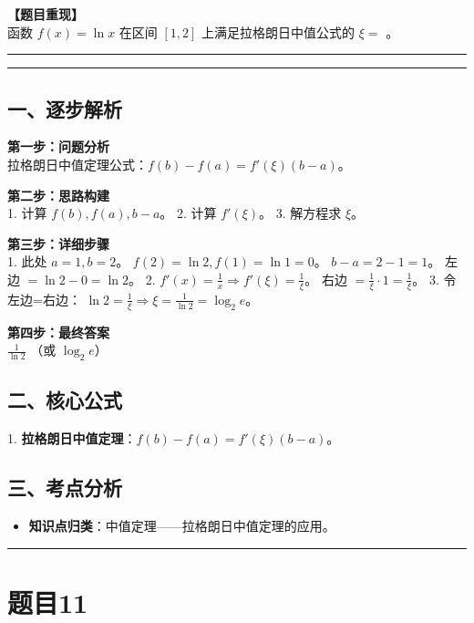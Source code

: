 \documentclass[12pt, a4paper]{ctexart}
\newcommand{\TopSeparator}{
    \par\noindent\rule{\textwidth}{1.5pt}\vspace{0.5em} %
}
\newcommand{\AnalysisSeparator}{
    \par\noindent\rule{\textwidth}{0.5pt}\vspace{0.2em}\hrule\vspace{0.5em} %
}
\newenvironment{RedAnalysis}{
    \par
    \color{red} %
}{
    \par
    \color{black} %
}
\begin{document}
\textbf{【题目重现】} \\
函数 $ f(x)=\ln x $ 在区间 $[1,2]$ 上满足拉格朗日中值公式的 $ \xi= $ \underline{\hspace{2cm}}。

\AnalysisSeparator

\begin{RedAnalysis}

\subsection*{一、逐步解析}

\textbf{第一步：问题分析} \\
拉格朗日中值定理公式：$f(b) - f(a) = f'(\xi)(b-a)$。

\textbf{第二步：思路构建} \\
1. 计算 $f(b), f(a), b-a$。
2. 计算 $f'(\xi)$。
3. 解方程求 $\xi$。

\textbf{第三步：详细步骤} \\
1. 此处 $a=1, b=2$。
   $f(2) = \ln 2, f(1) = \ln 1 = 0$。
   $b-a = 2-1 = 1$。
   左边 $= \ln 2 - 0 = \ln 2$。
2. $f'(x) = \frac{1}{x} \Rightarrow f'(\xi) = \frac{1}{\xi}$。
   右边 $= \frac{1}{\xi} \cdot 1 = \frac{1}{\xi}$。
3. 令左边=右边：
   $\ln 2 = \frac{1}{\xi} \Rightarrow \xi = \frac{1}{\ln 2} = \log_2 e$。

\textbf{第四步：最终答案} \\
$\frac{1}{\ln 2}$ （或 $\log_2 e$）

\subsection*{二、核心公式}
1. \textbf{拉格朗日中值定理}：$f(b)-f(a) = f'(\xi)(b-a)$。

\subsection*{三、考点分析}
\begin{itemize}
    \item \textbf{知识点归类}：中值定理——拉格朗日中值定理的应用。
\end{itemize}

\end{RedAnalysis}

\vspace{2em}

\TopSeparator
\section*{题目11}
\end{document}
